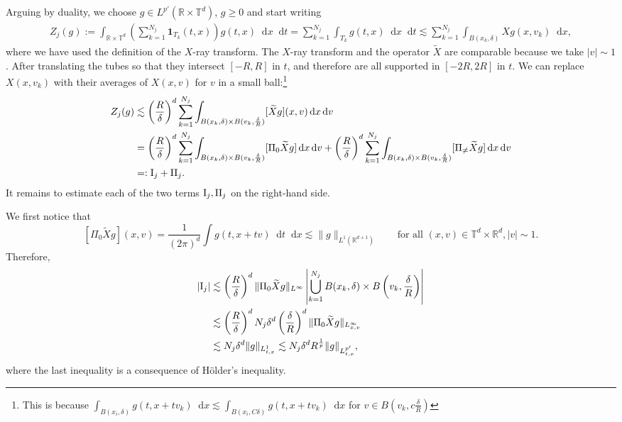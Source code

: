 \documentclass[11pt,a4paper,reqno]{amsart}
\theoremstyle{plain}
\theoremstyle{remark}
\newcommand{\dd}{\mathop{}\!\mathrm{d}}
\begin{document}
Arguing by duality, we choose $g \in L^{p'}(\mathbb{R} \times \mathbb{T}^d)$, $g\geq 0$ and start writing 
\begin{align*}
    Z_j(g):=\int_{\mathbb{R} \times \mathbb{T}^d} \left( \sum_{k=1}^{N_j} \mathbf{1}_{T_k}(t,x) \right) g(t,x) \dd x \dd t = \sum_{k=1}^{N_j} \int_{T_k} g(t,x) \dd x \dd t  \lesssim \sum_{k=1}^{N_j} \int_{B(x_k,\delta)} Xg(x,v_k) \dd x,
\end{align*}
where we have used the definition of the $X$-ray transform. The $X$-ray transform and the operator $\tilde{X}$ are comparable because we take $|v| \sim 1$. After translating the tubes so that they intersect $[-R,R]$ in $t$, and therefore are all supported in $[-2R,2R]$ in $t$. We can replace $X(x,v_k)$ with their averages of $X(x,v)$ for $v$ in a small ball:\footnote{This is because $\int_{B(x_i,\delta)}g(t,x+tv_k)\dd x \lesssim \int_{B(x_i,C\delta)}g(t,x+tv_k)\dd x$ for $v \in B\left(v_k, c\frac{\delta}{R}\right)$}
\begin{align*}
  Z_j(g) &\lesssim \left( \frac{R}{\delta} \right)^d  \sum_{k=1}^{N_j} \int_{B(x_k,\delta) \times B(v_k, \frac{\delta}{R})} [\widetilde{X}g] (x,v) \dd x \dd v \\
    & = \left( \frac{R}{\delta} \right)^d  \sum_{k=1}^{N_j} \int_{B(x_k,\delta) \times B(v_k, \frac{\delta}{R})} [\Pi_0 \widetilde{X}g] \dd x \dd v + \left( \frac{R}{\delta} \right)^d  \sum_{k=1}^{N_j} \int_{B(x_k,\delta) \times B(v_k, \frac{\delta}{R})} [\Pi_{\neq} \widetilde{X}g] \dd x \dd v \\
    & =: {\rm I}_j + {\rm II}_j.  
\end{align*}
It remains to estimate each of the two terms ${\rm I}_j,{\rm II}_j$ on the right-hand side. 

We first notice that
\[
    [\Pi_0 \widetilde X g ](x,v) = \frac{1}{(2\pi)^d} \int g(t,x+tv) \dd t \dd x \lesssim \| g \|_{L^1(\mathbb{R}^{d+1})} \qquad \text{for all } (x,v) \in \mathbb{T}^d \times \mathbb{R}^d, |v| \sim 1.
\]
Therefore,
\begin{align*}
|{\rm I}_j| & \lesssim \left( \frac{R}{\delta} \right)^d \| \Pi_0 \widetilde X g \|_{L^\infty} \left| \bigcup_{k=1}^{N_j} B(x_k,\delta) \times B\left(v_k, \frac{\delta}{R}\right) \right| \\
& \lesssim \left( \frac{R}{\delta} \right)^d N_j \delta^d \left(\frac{\delta}{R}\right)^d \| \Pi_0 \widetilde X g \|_{L^\infty_{x,v}} \\
&\lesssim N_j \delta^d \| g \|_{L^1_{t,x}} \lesssim N_j\delta^d R^{\frac{1}{p}} \| g \|_{L^{p'}_{t,x}},
\end{align*}
where the last inequality is a consequence of H\"older's inequality.
\end{document}
